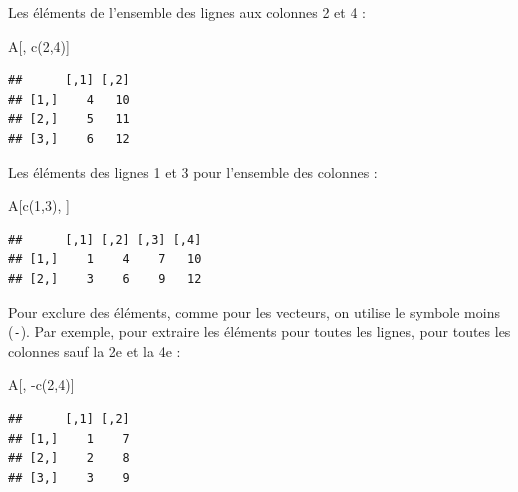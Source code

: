 \documentclass[
  11pt,
]{book}
\newenvironment{Shaded}{\begin{snugshade}}{\end{snugshade}}
\newcommand{\DecValTok}[1]{\textcolor[rgb]{0.00,0.00,0.81}{#1}}
\newcommand{\FunctionTok}[1]{\textcolor[rgb]{0.00,0.00,0.00}{#1}}
\newcommand{\NormalTok}[1]{#1}
\newcommand{\SpecialCharTok}[1]{\textcolor[rgb]{0.00,0.00,0.00}{#1}}
\numberwithin{equation}{section}
\numberwithin{countremarque}{section}
\begin{document}
Les éléments de l'ensemble des lignes aux colonnes 2 et 4 :

\begin{Shaded}
\begin{Highlighting}[]
\NormalTok{A[, }\FunctionTok{c}\NormalTok{(}\DecValTok{2}\NormalTok{,}\DecValTok{4}\NormalTok{)]}
\end{Highlighting}
\end{Shaded}

\begin{lstlisting}
##      [,1] [,2]
## [1,]    4   10
## [2,]    5   11
## [3,]    6   12
\end{lstlisting}

Les éléments des lignes 1 et 3 pour l'ensemble des colonnes :

\begin{Shaded}
\begin{Highlighting}[]
\NormalTok{A[}\FunctionTok{c}\NormalTok{(}\DecValTok{1}\NormalTok{,}\DecValTok{3}\NormalTok{), ]}
\end{Highlighting}
\end{Shaded}

\begin{lstlisting}
##      [,1] [,2] [,3] [,4]
## [1,]    1    4    7   10
## [2,]    3    6    9   12
\end{lstlisting}

Pour exclure des éléments, comme pour les vecteurs, on utilise le symbole moins (\texttt{-}). Par exemple, pour extraire les éléments pour toutes les lignes, pour toutes les colonnes sauf la 2e et la 4e :

\begin{Shaded}
\begin{Highlighting}[]
\NormalTok{A[, }\SpecialCharTok{{-}}\FunctionTok{c}\NormalTok{(}\DecValTok{2}\NormalTok{,}\DecValTok{4}\NormalTok{)]}
\end{Highlighting}
\end{Shaded}

\begin{lstlisting}
##      [,1] [,2]
## [1,]    1    7
## [2,]    2    8
## [3,]    3    9
\end{lstlisting}
\end{document}
